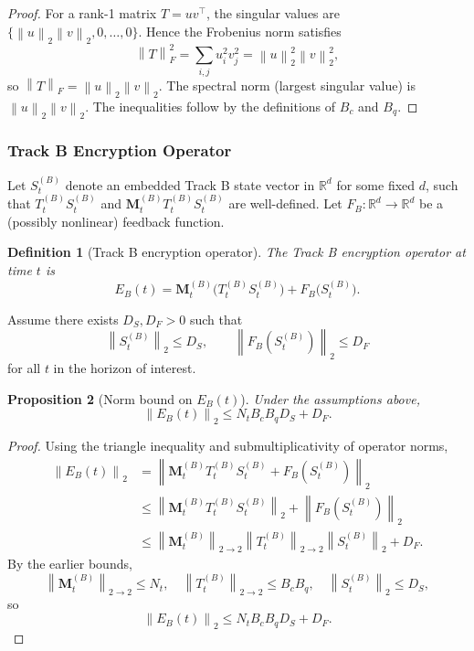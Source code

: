 \documentclass[11pt]{article}
\newtheorem{definition}{Definition}[section]
\newtheorem{proposition}[definition]{Proposition}
\newcommand{\R}{\mathbb{R}}
\newcommand{\norm}[1]{\left\lVert #1 \right\rVert}
\begin{document}
\begin{proof}
For a rank-1 matrix \(T = u v^\top\), the singular values are \(\{\norm{u}_2 \norm{v}_2,0,\dots,0\}\).
Hence the Frobenius norm satisfies
\[
  \norm{T}_F^2 = \sum_{i,j} u_i^2 v_j^2 = \norm{u}_2^2 \norm{v}_2^2,
\]
so \(\norm{T}_F = \norm{u}_2 \norm{v}_2\).
The spectral norm (largest singular value) is \(\norm{u}_2 \norm{v}_2\).
The inequalities follow by the definitions of \(B_c\) and \(B_q\).
\end{proof}

\subsubsection{Track B Encryption Operator}

Let \(S_t^{(B)}\) denote an embedded Track B state vector in \(\R^d\) for some fixed \(d\), such that \(T_t^{(B)} S_t^{(B)}\) and \(\mathbf{M}_t^{(B)} T_t^{(B)} S_t^{(B)}\) are well-defined.
Let \(F_B : \R^d \to \R^d\) be a (possibly nonlinear) feedback function.

\begin{definition}[Track B encryption operator]
The Track B encryption operator at time \(t\) is
\[
  E_B(t) = \mathbf{M}_t^{(B)} \bigl( T_t^{(B)} S_t^{(B)} \bigr) + F_B\bigl(S_t^{(B)}\bigr).
\]
\end{definition}

Assume there exists \(D_S, D_F > 0\) such that
\[
  \norm{S_t^{(B)}}_2 \le D_S, \qquad
  \norm{F_B(S_t^{(B)})}_2 \le D_F
\]
for all \(t\) in the horizon of interest.

\begin{proposition}[Norm bound on \(E_B(t)\)]
Under the assumptions above,
\[
  \norm{E_B(t)}_2 \le N_t B_c B_q D_S + D_F.
\]
\end{proposition}

\begin{proof}
Using the triangle inequality and submultiplicativity of operator norms,
\begin{align*}
  \norm{E_B(t)}_2
  &= \norm{\mathbf{M}_t^{(B)} T_t^{(B)} S_t^{(B)} + F_B(S_t^{(B)})}_2 \\
  &\le \norm{\mathbf{M}_t^{(B)} T_t^{(B)} S_t^{(B)}}_2 + \norm{F_B(S_t^{(B)})}_2 \\
  &\le \norm{\mathbf{M}_t^{(B)}}_{2\to2} \norm{T_t^{(B)}}_{2\to2} \norm{S_t^{(B)}}_2 + D_F.
\end{align*}
By the earlier bounds,
\[
  \norm{\mathbf{M}_t^{(B)}}_{2\to2} \le N_t, \quad
  \norm{T_t^{(B)}}_{2\to2} \le B_c B_q, \quad
  \norm{S_t^{(B)}}_2 \le D_S,
\]
so
\[
  \norm{E_B(t)}_2 \le N_t B_c B_q D_S + D_F.
\]
\end{proof}
\end{document}
